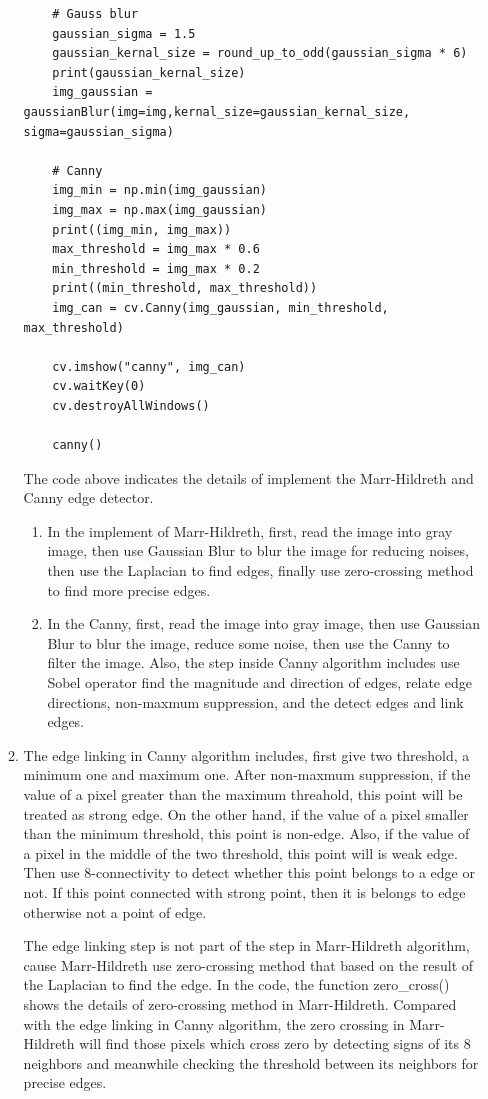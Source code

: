 \documentclass[12pt]{article}
\begin{document}
\begin{enumerate}[leftmargin=\labelsep]
\begin{enumerate}
\begin{lstlisting}
    # Gauss blur
    gaussian_sigma = 1.5
    gaussian_kernal_size = round_up_to_odd(gaussian_sigma * 6)
    print(gaussian_kernal_size)
    img_gaussian = gaussianBlur(img=img,kernal_size=gaussian_kernal_size, sigma=gaussian_sigma)

    # Canny
    img_min = np.min(img_gaussian)
    img_max = np.max(img_gaussian)
    print((img_min, img_max))
    max_threshold = img_max * 0.6
    min_threshold = img_max * 0.2
    print((min_threshold, max_threshold))
    img_can = cv.Canny(img_gaussian, min_threshold, max_threshold)

    cv.imshow("canny", img_can)
    cv.waitKey(0)
    cv.destroyAllWindows()

    canny()
    \end{lstlisting}
     The code above indicates the details of implement the Marr-Hildreth and Canny edge detector.
    \begin{enumerate}
        \item In the implement of Marr-Hildreth, first, read the image into gray image, then use Gaussian Blur to blur the image for reducing noises, then use the Laplacian to find edges, finally use zero-crossing method to find more precise edges.
        \item In the Canny, first, read the image into gray image, then use Gaussian Blur to blur the image, reduce some noise, then use the Canny to filter the image. Also, the step inside Canny algorithm includes use Sobel operator find the magnitude and direction of edges, relate edge directions, non-maxmum suppression, and the detect edges and link edges.
    \end{enumerate}
    
    \item The edge linking in Canny algorithm includes, first give two threshold, a minimum one and maximum one. 
          After non-maxmum suppression, if the value of a pixel greater than the maximum threahold, this point will be treated as strong edge.
          On the other hand, if the value of a pixel smaller than the minimum threshold, this point is non-edge.
          Also, if the value of a pixel in the middle of the two threshold, this point will is weak edge. Then use 8-connectivity to detect whether this point belongs to a edge or not. 
          If this point connected with strong point, then it is belongs to edge otherwise not a point of edge.

          The edge linking step is not part of the step in Marr-Hildreth algorithm, cause Marr-Hildreth use zero-crossing method that based on the result of the Laplacian to find the edge. 
          In the code, the function zero\_cross() shows the details of zero-crossing method in Marr-Hildreth.
          Compared with the edge linking in Canny algorithm, the zero crossing in Marr-Hildreth will find those pixels which cross zero by detecting signs of its 8 neighbors and meanwhile checking the threshold between its neighbors for precise edges. 


\end{enumerate}
\end{enumerate}
\end{document}
